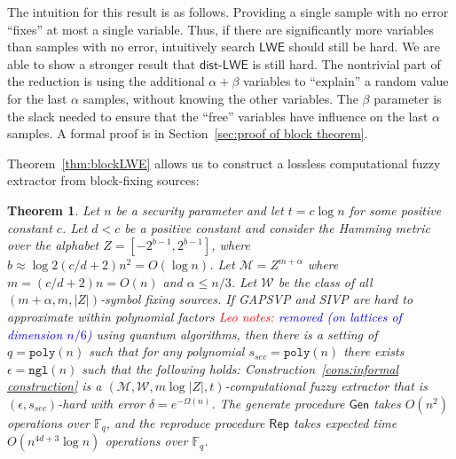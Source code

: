\documentclass[11pt]{article}
\newcommand{\secref}[1]{\mbox{Section~\ref{#1}}}
\newcommand{\thref}[1]{\mbox{Theorem~\ref{#1}}}
\newcommand{\consref}[1]{\mbox{Construction~\ref{#1}}}
\newcommand{\class}[1]{{\ensuremath{\mathsf{#1}}}}
\newcommand{\gen}{\ensuremath{\class{Gen}}\xspace}
\newcommand{\rep}{\ensuremath{\class{Rep}}\xspace}
\newcommand{\zo}{\ensuremath{\{0, 1\}}}
\newcommand{\Fq}{\ensuremath{\mathbb{F}_q}}
\newcommand{\poly}{\ensuremath{\mathtt{poly}}\xspace}
\newcommand{\ngl}{\ensuremath{\mathtt{ngl}}\xspace}
\newcommand{\Hoo}{\mathrm{H}_\infty}
\newcommand{\LWE}{\class{LWE}}
\newcommand{\distLWE}{\ensuremath{\class{dist\mbox{-}LWE}}}
\newtheorem{theorem}{Theorem}[section]
\newcommand{\authnote}[2]{{\textcolor{red}{\textsf{#1 notes: }\textcolor{blue}{ #2}}\marginpar{\textcolor{red}{\textbf{!!!!!}}}}}
\newcommand{\authnote}[2]{}
\newcommand{\lnote}[1]{{\authnote{Leo}{#1}}}
\newcommand{\M}{\mathcal{M}}
\begin{document}
The intuition for this result is as follows.  Providing a single sample with no error ``fixes'' at most a single variable.  Thus, if there are significantly more variables than samples with no error, intuitively search $\LWE$ should still be hard.  We are able to show a stronger result that $\distLWE$ is still hard.  The nontrivial part of the reduction is using the additional $\alpha+ \beta$ variables  to ``explain'' a random value for the last $\alpha$ samples, without knowing the other variables.  The $\beta$ parameter is the slack needed to ensure that the ``free'' variables have influence on the last $\alpha$ samples.  A formal proof is in \secref{sec:proof of block theorem}.


\thref{thm:blockLWE} allows us to construct a lossless computational fuzzy extractor from block-fixing sources: 


\begin{theorem}
\label{thm:lossless block sketch log}
Let $n$ be a security parameter and let $t = c\log n$ for some positive constant $c$.  Let $d<c$ be a positive constant and consider the Hamming metric over the alphabet $Z=[-2^{b-1},2^{b-1}]$, where $b \approx \log 2(c/d+2)n^2 = O(\log n)$.  Let $\mathcal{M} = Z^{m+\alpha}$ where $m= (c/d+2)n=O(n)$ and $\alpha \leq n/3$. 
Let $\mathcal{W}$ be the class of all $(m+\alpha, m, |Z|)$-symbol fixing sources.  If GAPSVP and SIVP are hard to approximate within polynomial factors \lnote{removed (on lattices of dimension $n/6$)} using quantum algorithms, then  there is a setting of $q = \poly(n)$ such that for any polynomial $s_{sec} = \poly(n)$
 there exists $\epsilon = \ngl(n)$ 
such that the following holds: \consref{cons:informal construction} is a $(\M, \mathcal{W}, m\log |Z|, t)$-computational fuzzy extractor that is $(\epsilon, s_{sec})$-hard with error $\delta = e^{-\Omega(n)}$.
 The generate procedure $\gen$ takes $O(n^2)$ operations over $\Fq$, and the reproduce procedure $\rep$ takes expected time $O(n^{4d+3} \log n)$ operations over $\Fq$.
\end{theorem}
\end{document}
